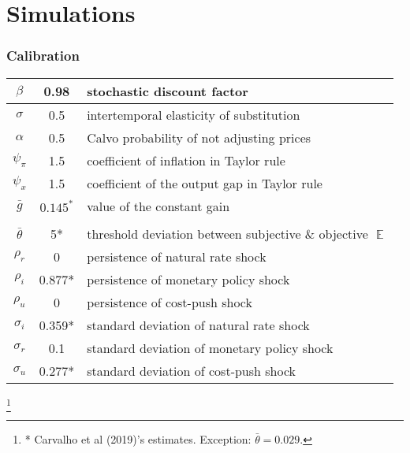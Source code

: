 \documentclass{beamer}
\DeclareMathOperator{\E}{\mathbb{E}}
\newcommand\blfootnote[1]{%
  \begingroup
  \renewcommand\thefootnote{}\footnote{#1}%
  \addtocounter{footnote}{-1}%
  \endgroup
}
\begin{document}
\section{Simulations}

\begin{frame}
	\frametitle{Calibration}

\begin{center}
\begin{tabular}{ c | c  | l }
 $\beta$ & 0.98 & stochastic discount factor \\  \hline
 $\sigma$ & 0.5  & intertemporal elasticity of substitution \\  \hline
 $\alpha$ & 0.5 &  Calvo probability of not adjusting prices \\\hline
 $\psi_{\pi} $& 1.5  & coefficient of inflation in Taylor rule \\\hline
 $\psi_x$ & 1.5   & coefficient of the output gap in Taylor rule  \\\hline
 $\bar{g}$ & $0.145^{*}$  & value of the constant gain \\\hline
& & \\ [-1em] %
 $\bar{\theta}$ &  5*  & threshold deviation between subjective \& objective $\E$ \\ \hline
    $\rho_r$ & 0 &   persistence of natural rate shock \\ \hline
    $\rho_i$ & 0.877* &  persistence of monetary policy shock  \\ \hline
    $\rho_u$ & 0  &  persistence of cost-push shock  \\ \hline
    $\sigma_i$ & 0.359* & standard deviation of natural rate shock  \\ \hline
    $\sigma_r$ &  0.1  &standard deviation of monetary policy shock  \\ \hline
    $\sigma_u$ & 0.277* & standard deviation of cost-push shock   \\ \hline
\end{tabular}
\end{center}


\blfootnote{* Carvalho et al (2019)'s estimates.  Exception: $\bar{\theta} = 0.029$.} 
\end{frame}
\end{document}
